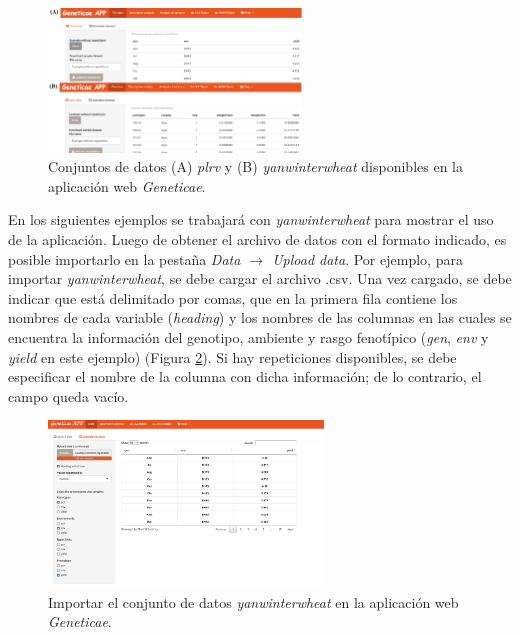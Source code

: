 \begin{figure}[H]
	\begin{center}
		\includegraphics[width=0.60\textwidth]{./Graficos/www/exampledata2.png}
	\end{center}
	\caption{Conjuntos de datos (A) \emph{plrv} y (B) \emph{yanwinterwheat} disponibles en la aplicación web \emph{Geneticae}.}
	\label{fig:dataexample}
\end{figure}

En los siguientes ejemplos se trabajará con \emph{yanwinterwheat} para mostrar el uso de la aplicación. Luego de obtener el archivo de datos con el formato indicado, es posible importarlo en la pestaña \emph{Data $\rightarrow$ Upload data}. Por ejemplo, para importar \emph{yanwinterwheat}, se debe cargar el archivo .csv. Una vez cargado, se debe indicar que está delimitado por comas, que en la primera fila contiene los nombres de cada variable (\emph{heading}) y los nombres de las columnas en las cuales se encuentra la información del genotipo, ambiente y rasgo fenotípico (\emph{gen}, \emph{env} y \emph{yield} en este ejemplo) (Figura \ref{fig:fig431}). Si hay repeticiones disponibles, se debe especificar el nombre de la columna con dicha información; de lo contrario, el campo queda vacío. 

 \begin{figure}[h]
	\begin{center}
		\includegraphics[width=0.65\textwidth]{./Graficos/www/Data.png}
	\end{center}
	\caption{Importar el conjunto de datos \emph{yanwinterwheat} en la aplicación web \emph{Geneticae}.}
	\label{fig:fig431}
\end{figure}

